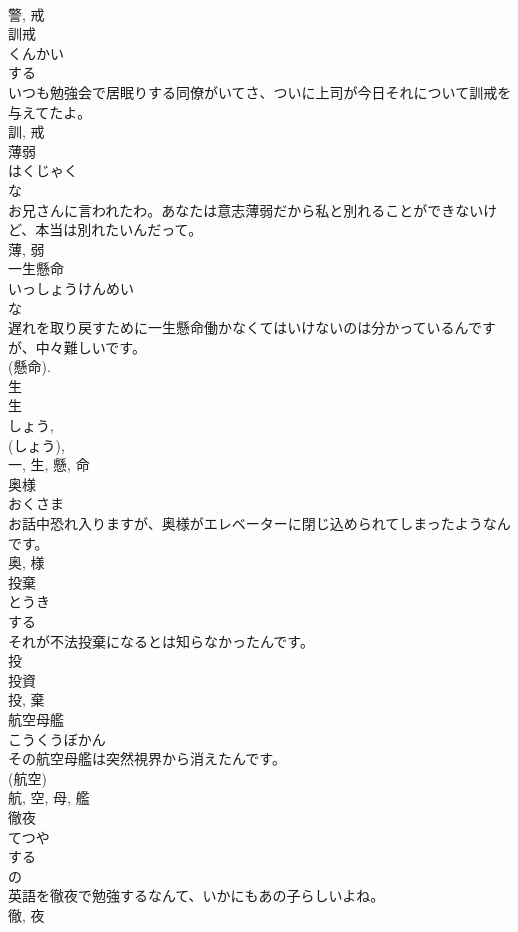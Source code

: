 \documentclass[8pt]{extreport}
\begin{document}
\begin{CJK}{UTF8}{min}
\\	警, 戒	
\\	訓戒	
\\	くんかい	
\\	する 
\\	いつも勉強会で居眠りする同僚がいてさ、ついに上司が今日それについて訓戒を与えてたよ。	
\\	訓, 戒	
\\	薄弱	
\\	はくじゃく	
\\	な 
\\	お兄さんに言われたわ。あなたは意志薄弱だから私と別れることができないけど、本当は別れたいんだって。	
\\	薄, 弱	
\\	一生懸命	
\\	いっしょうけんめい	
\\	な 
\\	遅れを取り戻すために一生懸命働かなくてはいけないのは分かっているんですが、中々難しいです。	
\\	(懸命). 
\\	生 
\\	生 
\\	しょう, 
\\	(しょう), 
\\	一, 生, 懸, 命	
\\	奥様	
\\	おくさま	
\\	お話中恐れ入りますが、奥様がエレベーターに閉じ込められてしまったようなんです。	
\\	奥, 様	
\\	投棄	
\\	とうき	
\\	する 
\\	それが不法投棄になるとは知らなかったんです。	
\\	投 
\\	投資 
\\	投, 棄	
\\	航空母艦	
\\	こうくうぼかん	
\\	その航空母艦は突然視界から消えたんです。	
\\	(航空) 
\\	航, 空, 母, 艦	
\\	徹夜	
\\	てつや	
\\	する 
\\	の 
\\	英語を徹夜で勉強するなんて、いかにもあの子らしいよね。	
\\	徹, 夜	

\end{CJK}
\end{document}
